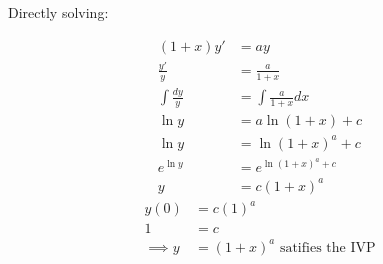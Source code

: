 \documentclass{article}
\begin{document}
\begin{enumerate}[label=(\arabic*)]
\begin{enumerate}
                Directly solving:
                \begin{multicols}{2}
                    \noindent
                    \begin{align*}
                        (1+x)y' &= ay \\
                        \frac{y'}{y} &= \frac{a}{1+x} \\
                        \int \frac{dy}{y} &= \int \frac{a}{1+x} dx \\
                        \ln y &= a \ln(1+x) + c \\
                        \ln y &= \ln(1+x)^a + c \\
                        e^{\ln y}&= e^{\ln(1+x)^a + c} \\
                        y &= c(1+x)^a
                    \end{align*}
                    \begin{align*}
                        y(0) &= c(1)^a \\
                        1 &= c \\
                        \implies y &= (1+x)^a \text{ satifies the IVP}\\
                    \end{align*}
                \end{multicols}


\end{enumerate}
\end{enumerate}
\end{document}
